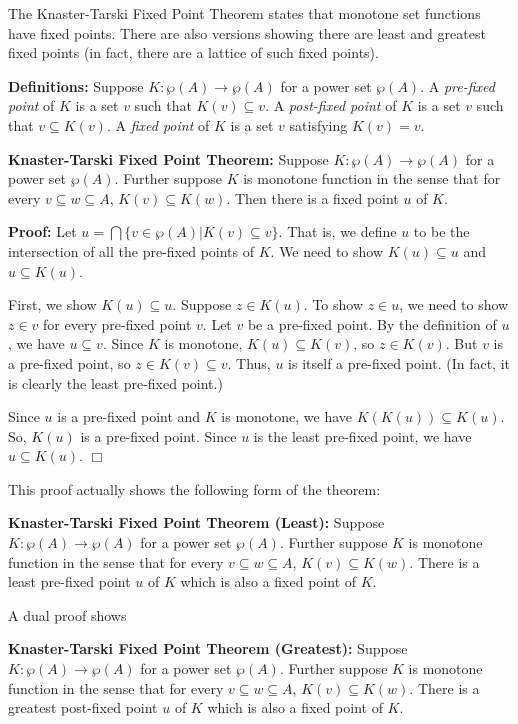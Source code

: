The Knaster-Tarski Fixed Point Theorem states that monotone
set functions have fixed points.  There are also versions
showing there are least and greatest fixed points (in fact,
there are a lattice of such fixed points).  %

{\bf Definitions:}  Suppose $K:\wp(A)\rightarrow \wp(A)$
for a power set $\wp(A)$.  A {\it pre-fixed point} of $K$ is a set $v$ such
that $K(v)\subseteq v$.  A {\it post-fixed point} of $K$ is a set $v$ such
that $v\subseteq K(v)$.  A {\it fixed point} of $K$ is a set $v$ satisfying $K(v) = v$.

{\bf Knaster-Tarski Fixed Point Theorem:}  Suppose $K:\wp(A)\rightarrow \wp(A)$
for a power set $\wp(A)$.  Further suppose $K$ is monotone function in
the sense that for every $v\subseteq w\subseteq A$, $K(v) \subseteq K(w)$.
Then there is a fixed point $u$ of $K$.

{\bf Proof:}  Let $u = \bigcap\{v\in\wp(A) | K(v) \subseteq v\}$.
That is, we define $u$ to be the intersection of all the pre-fixed points of $K$.
We need to show $K(u)\subseteq u$ and $u\subseteq K(u)$.

First, we show $K(u)\subseteq u$.  Suppose $z\in K(u)$.  To show $z\in u$,
we need to show $z\in v$ for every pre-fixed point $v$.  Let $v$ be a
pre-fixed point.  By the definition of $u$, we have $u\subseteq v$.
Since $K$ is monotone, $K(u)\subseteq K(v)$, so $z\in K(v)$.  But
$v$ is a pre-fixed point, so $z\in K(v)\subseteq v$.  Thus, $u$ is
itself a pre-fixed point.  (In fact, it is clearly the least pre-fixed point.)

Since $u$ is a pre-fixed point and $K$ is monotone,
we have $K(K(u)) \subseteq K(u)$.  So, $K(u)$ is a pre-fixed point.
Since $u$ is the least pre-fixed point, we have $u\subseteq K(u)$.
$\Box$

This proof actually shows the following form of the theorem:

{\bf Knaster-Tarski Fixed Point Theorem (Least):}  Suppose $K:\wp(A)\rightarrow \wp(A)$
for a power set $\wp(A)$.  Further suppose $K$ is monotone function in
the sense that for every $v\subseteq w\subseteq A$, $K(v) \subseteq K(w)$.
There is a least pre-fixed point $u$ of $K$ which is also a fixed point of $K$.

A dual proof shows

{\bf Knaster-Tarski Fixed Point Theorem (Greatest):}  Suppose $K:\wp(A)\rightarrow \wp(A)$
for a power set $\wp(A)$.  Further suppose $K$ is monotone function in
the sense that for every $v\subseteq w\subseteq A$, $K(v) \subseteq K(w)$.
There is a greatest post-fixed point $u$ of $K$ which is also a fixed point of $K$.

